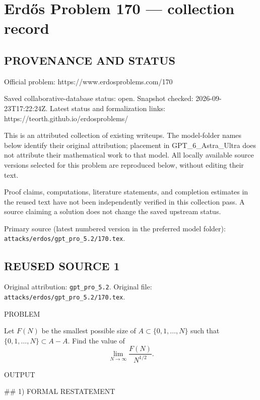 \section*{Erd\H{o}s Problem 170 --- collection record}

\subsection*{PROVENANCE AND STATUS}
Official problem: https://www.erdosproblems.com/170

Saved collaborative-database status: open.
Snapshot checked: 2026-09-23T17:22:24Z.
Latest status and formalization links: https://teorth.github.io/erdosproblems/

This is an attributed collection of existing writeups. The model-folder names below identify their original attribution; placement in GPT\_6\_Astra\_Ultra does not attribute their mathematical work to that model. All locally available source versions selected for this problem are reproduced below, without editing their text.

Proof claims, computations, literature statements, and completion estimates in the reused text have not been independently verified in this collection pass. A source claiming a solution does not change the saved upstream status.

Primary source (latest numbered version in the preferred model folder): \texttt{attacks/erdos/gpt\_pro\_5.2/170.tex}.

\subsection*{REUSED SOURCE 1}
Original attribution: \texttt{gpt\_pro\_5.2}.
Original file: \texttt{attacks/erdos/gpt\_pro\_5.2/170.tex}.


PROBLEM

Let $F(N)$ be the smallest possible size of $A\subset \{0,1,\ldots,N\}$ such that $\{0,1,\ldots,N\}\subset A-A$. Find the value of
\[\lim_{N\to \infty}\frac{F(N)}{N^{1/2}}.\]

OUTPUT

## 1) FORMAL RESTATEMENT

